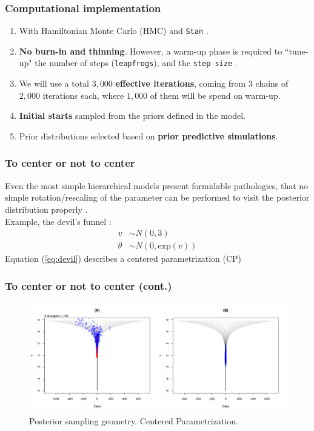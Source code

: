 \documentclass[arial,12pt,xcolor=dvipsnames]{beamer}
\begin{document}
\begin{frame}
	\frametitle{Computational implementation}
	\begin{enumerate}
		\item With Hamiltonian Monte Carlo (HMC) and \texttt{Stan} \cite{Stan2020}.
		\item \textbf{No burn-in and thinning}. However, a warm-up phase is required to ``tune-up" the number of steps (\texttt{leapfrogs}), and the \texttt{step size} \cite{Stan2020}.
		\item We will use a total $3,000$ \textbf{effective iterations}, coming from $3$ chains of $2,000$ iterations each, where $1,000$ of them will be spend on warm-up.
		\item \textbf{Initial starts} sampled from the priors defined in the model.
		\item Prior distributions selected based on \textbf{prior predictive simulations}.
	\end{enumerate}
\end{frame}
%
\begin{frame}
	\frametitle{To center or not to center}
	Even the most simple hierarchical models present formidable pathologies, that no simple rotation/rescaling of the parameter can be performed to visit the posterior distribution properly \cite{Betancourt_et_al_2013}. \\
	\vspace{0.3cm} Example, the devil's funnel \cite{McElreath_2020}:
	\begin{equation} \label{eq:devil}
		\begin{split}	
			v &\sim N(0, 3) \\
			\theta &\sim N(0, \text{exp}(v))
		\end{split}
	\end{equation}
	Equation (\ref{eq:devil}) describes a centered parametrization (CP)
\end{frame}
%
\begin{frame}
	\frametitle{To center or not to center (cont.)}
	\begin{figure}[h]
		\centering
		\includegraphics[width=1\linewidth]{1_funnel_CE_simple}
		\caption{Posterior sampling geometry. Centered Parametrization.}
		\label{fig:devil_CE_geom}
	\end{figure}
\end{frame}
\end{document}

